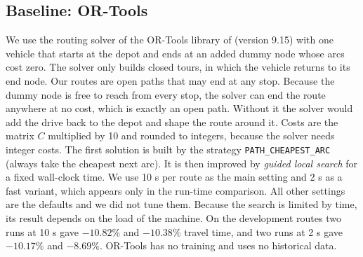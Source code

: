 \documentclass[11pt,a4paper]{article}
\newcommand{\mention}[1]{\citeauthor*{#1}}
\begin{document}
\subsection{Baseline: OR-Tools}\label{sec:ortools}
We use the routing solver of the OR-Tools library of \mention{ortools} (version 9.15) with one vehicle that starts at the depot and ends at an added dummy node whose arcs cost zero. The solver only builds closed tours, in which the vehicle returns to its end node. Our routes are open paths that may end at any stop. Because the dummy node is free to reach from every stop, the solver can end the route anywhere at no cost, which is exactly an open path. Without it the solver would add the drive back to the depot and shape the route around it. Costs are the matrix $C$ multiplied by 10 and rounded to integers, because the solver needs integer costs. The first solution is built by the strategy \texttt{PATH\_CHEAPEST\_ARC} (always take the cheapest next arc). It is then improved by \emph{guided local search} for a fixed wall-clock time. We use 10 s per route as the main setting and 2 s as a fast variant, which appears only in the run-time comparison. All other settings are the defaults and we did not tune them. Because the search is limited by time, its result depends on the load of the machine. On the development routes two runs at 10 s gave $-10.82\%$ and $-10.38\%$ travel time, and two runs at 2 s gave $-10.17\%$ and $-8.69\%$. OR-Tools has no training and uses no historical data.
\end{document}
